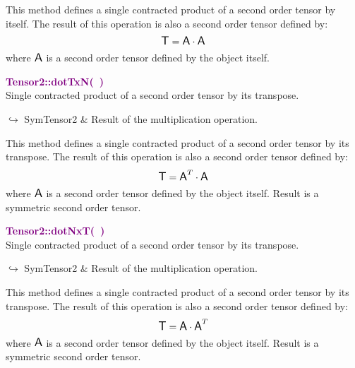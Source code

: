 This method defines a single contracted product of a second order tensor by itself.
The result of this operation is also a second order tensor defined by:
\begin{equation*}
\mbox{\large\ensuremath{\mathsf{T}}} = \mbox{\large\ensuremath{\mathsf{A}}} \cdot \mbox{\large\ensuremath{\mathsf{A}}}
\end{equation*}
where $\mbox{\large\ensuremath{\mathsf{A}}}$ is a second order tensor defined by the object itself.

\textcolor{purple}{\textbf{Tensor2::dotTxN(~)}}\label{Tensor2::dotTxN()}\\
Single contracted product of a second order tensor by its transpose.\vspace*{-0.5em}
\begin{tcolorbox}[grow to left by=-1cm, width=\textwidth-1cm,myArgs,tabularx={l|R}]
$\hookrightarrow$ SymTensor2 & Result of the multiplication operation.
\end{tcolorbox}

This method defines a single contracted product of a second order tensor by its transpose.
The result of this operation is also a second order tensor defined by:
\begin{equation*}
\mbox{\large\ensuremath{\mathsf{T}}} = \mbox{\large\ensuremath{\mathsf{A}}}^T\cdot \mbox{\large\ensuremath{\mathsf{A}}}
\end{equation*}
where $\mbox{\large\ensuremath{\mathsf{A}}}$ is a second order tensor defined by the object itself. Result is a symmetric second order tensor.

\textcolor{purple}{\textbf{Tensor2::dotNxT(~)}}\label{Tensor2::dotNxT()}\\
Single contracted product of a second order tensor by its transpose.\vspace*{-0.5em}
\begin{tcolorbox}[grow to left by=-1cm, width=\textwidth-1cm,myArgs,tabularx={l|R}]
$\hookrightarrow$ SymTensor2 & Result of the multiplication operation.
\end{tcolorbox}

This method defines a single contracted product of a second order tensor by its transpose.
The result of this operation is also a second order tensor defined by:
\begin{equation*}
\mbox{\large\ensuremath{\mathsf{T}}} = \mbox{\large\ensuremath{\mathsf{A}}} \cdot \mbox{\large\ensuremath{\mathsf{A}}}^T
\end{equation*}
where $\mbox{\large\ensuremath{\mathsf{A}}}$ is a second order tensor defined by the object itself. Result is a symmetric second order tensor.

